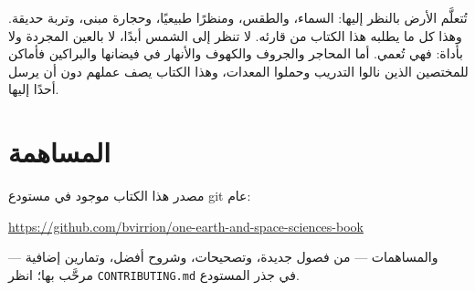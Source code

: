 تُتعلَّم الأرض بالنظر إليها: السماء، والطقس، ومنظرًا طبيعيًا، وحجارة
مبنى، وتربة حديقة. وهذا كل ما يطلبه هذا الكتاب من قارئه. لا تنظر إلى
الشمس أبدًا، لا بالعين المجردة ولا بأداة: فهي تُعمي. أما المحاجر والجروف
والكهوف والأنهار في فيضانها والبراكين فأماكن للمختصين الذين نالوا التدريب
وحملوا المعدات، وهذا الكتاب يصف عملهم دون أن يرسل أحدًا إليها.

\section*{المساهمة}

مصدر هذا الكتاب موجود في مستودع git عام:
\begin{center}
\url{https://github.com/bvirrion/one-earth-and-space-sciences-book}
\end{center}
والمساهمات --- من فصول جديدة، وتصحيحات، وشروح أفضل، وتمارين إضافية ---
مرحَّب بها؛ انظر \texttt{CONTRIBUTING.md} في جذر المستودع.
